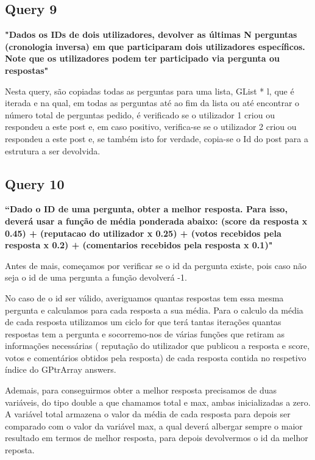 \documentclass[a4paper]{report}
\begin{document}
\subsection*{Query 9}
\label{sec:query9}

\textbf{"Dados os IDs de dois utilizadores, devolver as últimas
N perguntas (cronologia inversa) em que participaram dois utilizadores específicos.
Note que os utilizadores podem ter participado via pergunta ou respostas"}

Nesta query, são copiadas todas as perguntas para uma lista, GList * l, que é iterada
e na qual, em todas as perguntas até ao fim da lista ou até encontrar o número total de
perguntas pedido, é verificado se o utilizador 1 criou ou respondeu a este post e, em
caso positivo, verifica-se se o utilizador 2 criou ou respondeu a este post e, se
também isto for verdade, copia-se o Id do post para a estrutura a ser devolvida.



\subsection*{Query 10}
\label{sec:query10}
\textbf{“Dado o ID de uma pergunta, obter a melhor resposta.
Para isso, deverá usar a função de média ponderada abaixo: (score da resposta x 0.45)
+ (reputacao do utilizador x 0.25) + (votos recebidos pela resposta x 0.2) +
(comentarios recebidos pela resposta x 0.1)"}

Antes de mais, começamos por verificar se o id da pergunta existe, pois caso não
seja o id de uma pergunta a função devolverá -1. \par
No caso de o id ser válido, averiguamos quantas respostas tem essa mesma pergunta
e calculamos para cada resposta a sua média. Para o calculo da média de cada resposta
utilizamos um ciclo for que terá tantas iterações quantas respostas tem a pergunta e
socorremo-nos de várias funções que retiram as informações necessárias ( reputação
do utilizador que publicou a resposta e score, votos e comentários obtidos pela resposta)
de cada resposta contida no respetivo índice do GPtrArray answers. \par
Ademais, para conseguirmos obter a melhor resposta precisamos de duas variáveis,
do tipo double a que chamamos total e max, ambas inicializadas a zero. A variável total
armazena o valor da média de cada resposta para depois ser comparado com o valor da variável
max, a qual deverá albergar sempre o maior resultado em termos de melhor resposta, para
depois devolvermos o id da melhor reposta.
\end{document}
